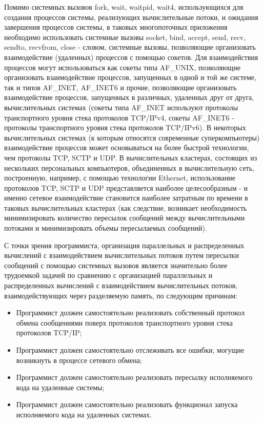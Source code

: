 Помимо системных вызовов fork, wait, waitpid, wait4, использующихся для создания процессов системы, реализующих вычислительные потоки, и ожидания завершения процессов системы, в таковых многопоточных приложения необходимо использовать системные вызовы socket, bind, accept, send, recv, sendto, recvfrom, close - словом, системные вызовы, позволяющие организовать взаимодействие (удаленных) процессов с помощью сокетов. Для взаимодействия процессов могут использоваться как сокеты типа AF\_UNIX, позволяющие организовать взаимодействие процессов, запущенных в одной и той же системе, так и типов AF\_INET, AF\_INET6 и прочие, позволяющие организовать взаимодействие процессов, запущенных в различных, удаленных друг от друга, вычислительных системах (сокеты типа AF\_INET используют протоколы транспортного уровня стека протоколов TCP/IPv4, сокеты AF\_INET6 - протоколы транспортного уровня стека протоколов TCP/IPv6). В некоторых вычислительных системах (к которым относятся современные суперкомпьютеры) взаимодействие процессов может основываться на более быстрой технологии, чем протоколы TCP, SCTP и UDP. В вычислительных кластерах, состоящих из нескольких персональных компьютеров, объединенных в вычислительную сеть, построенную, например, с помощью технологии Ethernet, использование протоколов TCP, SCTP и UDP представляется наиболее целесообразным - и именно сетевое взаимодействие становится наиболее затратным по времени в таковых вычислительных кластерах (как следствие, возникает необходимость минимизировать количество пересылок сообщений между вычислительными потоками и минимизировать объемы пересылаемых сообщений).

С точки зрения программиста, организация параллельных и распределенных вычислений с взаимодействием вычислительных потоков путем пересылки сообщений с помощью системных вызовов \gl является значительно более трудоемкой задачей по сравнению с организацией параллельных и распределенных вычислений с взаимодействием вычислительных потоков, взаимодействующих через разделяемую память, по следующим причинам:

\begin{itemize}

	\item Программист должен самостоятельно реализовать собственный протокол обмена сообщениями поверх протоколов транспортного уровня стека протоколов TCP/IP;
	\item Программист должен самостоятельно отслеживать все ошибки, могущие возникнуть в процессе сетевого обмена;
	\item Программист должен самостоятельно реализовать пересылку исполняемого кода на удаленные системы;
	\item Программист должен самостоятельно реализовать функционал запуска исполняемого кода на удаленных системах.

\end{itemize}

